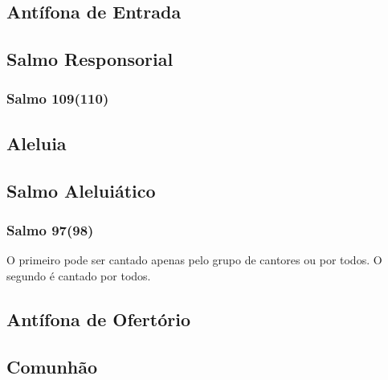 \subsection{Antífona de Entrada}\label{subsection:tempus-nativitatis/in-nativitatis-domini/introitus}


\subsection[Salmo Responsorial]{Salmo Responsorial}\label{subsection:tempus-nativitatis/in-nativitatis-domini/psalmus-responsorius}
\subsubsection{Salmo 109(110)}

\AllowPageFlush

\subsection{Aleluia}\label{subsection:tempus-nativitatis/in-nativitatis-domini/alleluia}

\AllowPageFlush

\subsection[Salmo Aleluiático]{Salmo Aleluiático}\label{subsection:tempus-nativitatis/in-nativitatis-domini/psalmus-alleluiaticus}
\subsubsection{Salmo 97(98)}
\begin{rubrica}
  O primeiro {\normalfont\Rbar} pode ser cantado apenas pelo grupo de cantores ou por todos. O segundo {\normalfont\Rbar} é cantado por todos.
\end{rubrica}

\AllowPageFlush

\subsection{Antífona de Ofertório}\label{subsection:tempus-nativitatis/in-nativitatis-domini/offertorium}

\AllowPageFlush

\subsection{Comunhão}\label{subsection:tempus-nativitatis/in-nativitatis-domini/communio}

\AllowPageFlush